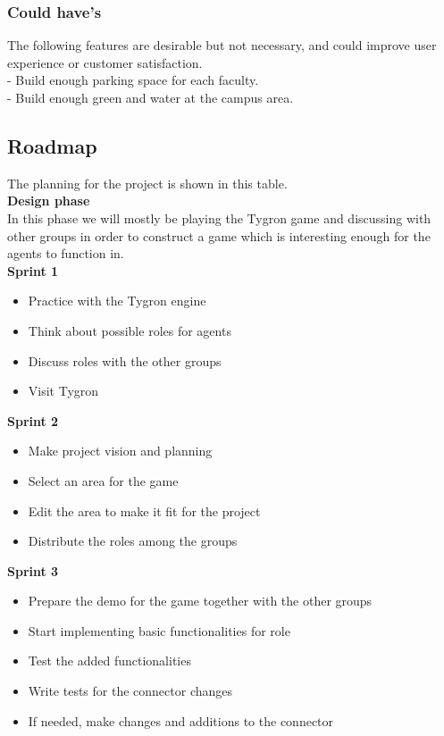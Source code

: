 \subsubsection{Could have's}
The following features are desirable but not necessary, and could improve user experience or customer satisfaction.\\
\indent- 	Build enough parking space for each faculty.\\
\indent-    	Build enough green and water at the campus area.\\

\subsection{Roadmap}
The planning for the project is shown in this table.\\

\textbf{Design phase}\\

In this phase we will mostly be playing the Tygron game and discussing with other groups in order to construct a game which is interesting enough for the agents to function in.\\

\textbf{Sprint 1}

\begin{itemize}
  \item Practice with the Tygron engine
  \item Think about possible roles for agents
  \item Discuss roles with the other groups
  \item Visit Tygron\\
\end{itemize}

\textbf{Sprint 2}

\begin{itemize}
  \item Make project vision and planning
  \item Select an area for the game
  \item Edit the area to make it fit for the project
  \item Distribute the roles among the groups\\
\end{itemize}

\textbf{Sprint 3}

\begin{itemize}
  \item Prepare the demo for the game together with the other groups
  \item Start implementing basic functionalities for role
  \item Test the added functionalities
  \item Write tests for the connector changes
  \item If needed, make changes and additions to the connector\\
\end{itemize}


